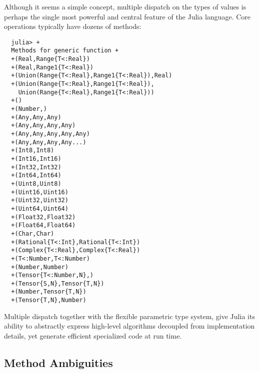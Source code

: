 \documentclass{article}
\renewcommand{\sec}[1]{\label{sec:#1}}
\begin{document}
Although it seems a simple concept, multiple dispatch on the types of values is perhaps the single most powerful and central feature of the Julia language.
Core operations typically have dozens of methods:
\begin{verbatim}
  julia> +
  Methods for generic function +
  +(Real,Range{T<:Real})
  +(Real,Range1{T<:Real})
  +(Union(Range{T<:Real},Range1{T<:Real}),Real)
  +(Union(Range{T<:Real},Range1{T<:Real}),
    Union(Range{T<:Real},Range1{T<:Real}))
  +()
  +(Number,)
  +(Any,Any,Any)
  +(Any,Any,Any,Any)
  +(Any,Any,Any,Any,Any)
  +(Any,Any,Any,Any...)
  +(Int8,Int8)
  +(Int16,Int16)
  +(Int32,Int32)
  +(Int64,Int64)
  +(Uint8,Uint8)
  +(Uint16,Uint16)
  +(Uint32,Uint32)
  +(Uint64,Uint64)
  +(Float32,Float32)
  +(Float64,Float64)
  +(Char,Char)
  +(Rational{T<:Int},Rational{T<:Int})
  +(Complex{T<:Real},Complex{T<:Real})
  +(T<:Number,T<:Number)
  +(Number,Number)
  +(Tensor{T<:Number,N},)
  +(Tensor{S,N},Tensor{T,N})
  +(Number,Tensor{T,N})
  +(Tensor{T,N},Number)
\end{verbatim}
Multiple dispatch together with the flexible parametric type system, give Julia its ability to abstractly express high-level algorithms decoupled from implementation details, yet generate efficient specialized code at run time.

\subsection{Method Ambiguities}\sec{method-ambiguities}
\end{document}
